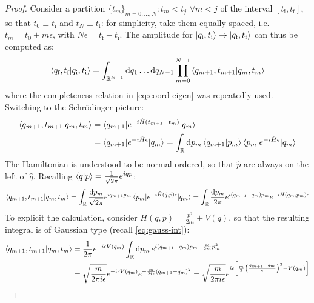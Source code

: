 \begin{proofbox}
  \begin{proof}
    Consider a partition $ \{t_m\}_{m = 0, \dots, N} : t_m < t_j \,\,\forall m < j $ of the interval $ [t_\text{i} , t_\text{f}] $, so that $ t_0 \equiv t_\text{i} $ and $ t_N \equiv t_\text{f} $: for simplicity, take them equally spaced, i.e. $ t_m = t_0 + m \epsilon $, with $ N \epsilon = t_\text{f} - t_\text{i} $. The amplitude for $ \ket{q_\text{i},t_\text{i}} \rightarrow \ket{q_\text{f},t_\text{f}} $ can thus be computed as:
    \begin{equation*}
      \braket{q_\text{f},t_\text{f} | q_\text{i},t_\text{i}} = \int_{\mathbb{R}^{N-1}} \mathrm{d} q_1 \dots \mathrm{d} q_{N-1} \prod_{m = 0}^{N-1} \braket{q_{m+1} , t_{m+1} | q_m , t_m}
    \end{equation*}
    where the completeness relation in \eqref{eq:coord-eigen} was repeatedly used. Switching to the Schrödinger picture:
    \begin{equation*}
      \begin{split}
        \braket{q_{m+1} , t_{m+1} | q_m , t_m}
        & = \braket{q_{m+1} | e^{-i \hat H (t_{m+1} - t_m)} | q_m} \\
        & = \braket{q_{m+1} | e^{-i \hat H \epsilon} | q_m} = \int_{\mathbb{R}} \mathrm{d} p_m \braket{q_{m+1} | p_m} \braket{p_m | e^{-i \hat H \epsilon} | q_m}
      \end{split}
    \end{equation*}
    The Hamiltonian is understood to be normal-ordered, so that $ \hat p $ are always on the left of $ \hat q $. Recalling $ \braket{q | p} = \frac{1}{\sqrt{2\pi}} e^{iqp} $:
    \begin{equation*}
      \braket{q_{m+1} , t_{m+1} | q_m , t_m} = \int_{\mathbb{R}} \frac{\mathrm{d} p_m}{\sqrt{2\pi}} e^{iq_{m+1} p_m} \braket{p_m | e^{-i \hat H(\hat q, \hat p) \epsilon} | q_m} = \int_{\mathbb{R}} \frac{\mathrm{d} p_m}{2\pi} e^{i (q_{m+1} - q_m) p_m} e^{-i H(q_m,p_m) \epsilon}
    \end{equation*}
    To explicit the calculation, consider $ H(q,p) = \frac{p^2}{2m} + V(q) $, so that the resulting integral is of Gaussian type (recall \eqref{eq:gauss-int}):
    \begin{equation*}
      \begin{split}
        \braket{q_{m+1} , t_{m+1} | q_m , t_m}
        & = \frac{1}{2\pi} e^{-i \epsilon V(q_m)} \int_\R \dd p_m\, e^{i (q_{m+1} - q_m) p_m - \frac{i \epsilon}{2m} p_m^2} \\
        & = \sqrt{\frac{m}{2\pi i\epsilon}} e^{-i \epsilon V(q_m)} e^{- \frac{m}{2i\epsilon} (q_{m+1} - q_m)^2} = \sqrt{\frac{m}{2\pi i \epsilon}} e^{i \epsilon \left[ \frac{m}{2} \left( \frac{q_{m+1} - q_m}{\epsilon} \right)^2 - V(q_m) \right]}

\end{split}
\end{equation*}
\end{proof}
\end{proofbox}
